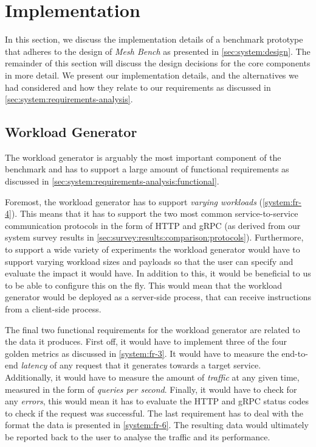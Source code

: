 \section{Implementation}
\label{sec:system:implementation}

In this section, we discuss the implementation details of a benchmark prototype that adheres to the design of \textit{Mesh Bench} as presented in \cref{sec:system:design}. The remainder of this section will discuss the design decisions for the core components in more detail. We present our implementation details, and the alternatives we had considered and how they relate to our requirements as discussed in \cref{sec:system:requirements-analysis}.

\subsection{Workload Generator}
\label{sec:system:workload-generator}

The workload generator is arguably the most important component of the benchmark and has to support a large amount of functional requirements as discussed in \cref{sec:system:requirements-analysis:functional}. 

Foremost, the workload generator has to support \textit{varying workloads} (\ref{system:fr-4}). This means that it has to support the two most common service-to-service communication protocols in the form of HTTP and gRPC (as derived from our system survey results in \cref{sec:survey:results:comparison:protocols}). Furthermore, to support a wide variety of experiments the workload generator would have to support varying workload sizes and payloads so that the user can specify and evaluate the impact it would have. In addition to this, it would be beneficial to us to be able to configure this on the fly. This would mean that the workload generator would be deployed as a server-side process, that can receive instructions from a client-side process. 

The final two functional requirements for the workload generator are related to the data it produces. First off, it would have to implement three of the four golden metrics as discussed in \ref{system:fr-3}. It would have to measure the end-to-end \textit{latency} of any request that it generates towards a target service. Additionally, it would have to measure the amount of \textit{traffic} at any given time, measured in the form of \textit{queries per second}. Finally, it would have to check for any \textit{errors}, this would mean it has to evaluate the HTTP and gRPC status codes to check if the request was successful. The last requirement has to deal with the format the data is presented in \ref{system:fr-6}. The resulting data would ultimately be reported back to the user to analyse the traffic and its performance.


